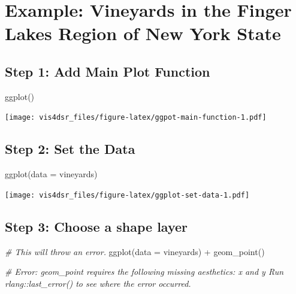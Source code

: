 \documentclass[
]{krantz}
\makeatletter
\newenvironment{Shaded}{\begin{snugshade}}{\end{snugshade}}
\newcommand{\AttributeTok}[1]{\textcolor[rgb]{0.61,0.61,0.61}{#1}}
\newcommand{\CommentTok}[1]{\textcolor[rgb]{0.37,0.37,0.37}{\textit{#1}}}
\newcommand{\FunctionTok}[1]{\textcolor[rgb]{0,0,0}{#1}}
\newcommand{\NormalTok}[1]{#1}
\newcommand{\SpecialCharTok}[1]{\textcolor[rgb]{0,0,0}{#1}}
\newenvironment{kframe}{%
\medskip{}
\setlength{\fboxsep}{.8em}
 \def\at@end@of@kframe{}%
 \ifinner\ifhmode%
  \def\at@end@of@kframe{\end{minipage}}%
  \begin{minipage}{\columnwidth}%
 \fi\fi%
 \def\FrameCommand##1{\hskip\@totalleftmargin \hskip-\fboxsep
 \colorbox{shadecolor}{##1}\hskip-\fboxsep
     \hskip-\linewidth \hskip-\@totalleftmargin \hskip\columnwidth}%
 \MakeFramed {\advance\hsize-\width
   \@totalleftmargin\z@ \linewidth\hsize
   \@setminipage}}%
 {\par\unskip\endMakeFramed%
 \at@end@of@kframe}
\renewenvironment{Shaded}{\begin{kframe}}{\end{kframe}}
\makeatother
\begin{document}
\hypertarget{example-vineyards-in-the-finger-lakes-region-of-new-york-state}{%
\section{Example: Vineyards in the Finger Lakes Region of New York State}\label{example-vineyards-in-the-finger-lakes-region-of-new-york-state}}

\hypertarget{step-1-add-main-plot-function}{%
\subsection{Step 1: Add Main Plot Function}\label{step-1-add-main-plot-function}}

\begin{Shaded}
\begin{Highlighting}[]
\FunctionTok{ggplot}\NormalTok{()}
\end{Highlighting}
\end{Shaded}

\texttt{[image: vis4dsr\_files/figure-latex/ggpot-main-function-1.pdf]}

\hypertarget{step-2-set-the-data}{%
\subsection{Step 2: Set the Data}\label{step-2-set-the-data}}

\begin{Shaded}
\begin{Highlighting}[]
\FunctionTok{ggplot}\NormalTok{(}\AttributeTok{data =}\NormalTok{ vineyards)}
\end{Highlighting}
\end{Shaded}

\texttt{[image: vis4dsr\_files/figure-latex/ggplot-set-data-1.pdf]}

\hypertarget{step-3-choose-a-shape-layer}{%
\subsection{Step 3: Choose a shape layer}\label{step-3-choose-a-shape-layer}}

\begin{Shaded}
\begin{Highlighting}[]
\CommentTok{\# This will throw an error.}
\FunctionTok{ggplot}\NormalTok{(}\AttributeTok{data =}\NormalTok{ vineyards) }\SpecialCharTok{+}
  \FunctionTok{geom\_point}\NormalTok{()}

\CommentTok{\# Error: geom\_point requires the following missing aesthetics: x and y Run \textasciigrave{}rlang::last\_error()\textasciigrave{} to see where the error occurred.}
\end{Highlighting}
\end{Shaded}
\end{document}
